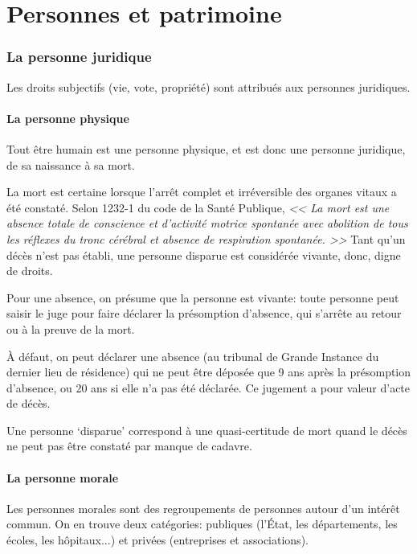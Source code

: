 \documentclass[10pt,a4paper]{article}
\begin{document}
\part{Personnes et patrimoine}

\section{La personne juridique}

Les droits subjectifs (vie, vote, propriété) sont attribués aux personnes juridiques.

\subsection{La personne physique}

Tout être humain est une personne physique, et est donc une personne juridique, de sa naissance à sa mort.

La mort est certaine lorsque l'arrêt complet et irréversible des organes vitaux a été constaté. Selon 1232-1 du code de la Santé Publique, \textit{<< La mort est une absence totale de conscience et d'activité motrice spontanée avec abolition de tous les réflexes du tronc cérébral et absence de respiration spontanée. >>} Tant qu'un décès n'est pas établi, une personne disparue est considérée vivante, donc, digne de droits.

Pour une absence, on présume que la personne est vivante: toute personne peut saisir le juge pour faire déclarer la présomption d'absence, qui s'arrête au retour ou à la preuve de la mort.

À défaut, on peut déclarer une absence (au tribunal de Grande Instance du dernier lieu de résidence) qui ne peut être déposée que 9 ans après la présomption d'absence, ou 20 ans si elle n'a pas été déclarée. Ce jugement a pour valeur d'acte de décès.

Une personne `disparue' correspond à une quasi-certitude de mort quand le décès ne peut pas être constaté par manque de cadavre.

\subsection{La personne morale}

Les personnes morales sont des regroupements de personnes autour d'un intérêt commun. On en trouve deux catégories: publiques (l'État, les départements, les écoles, les hôpitaux...) et privées (entreprises et associations).
\end{document}

